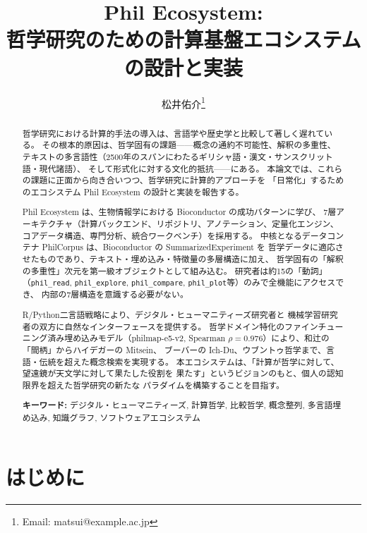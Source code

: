 \documentclass[a4paper,11pt]{ltjsarticle}
\title{{\LARGE Phil Ecosystem:\\
哲学研究のための計算基盤エコシステムの設計と実装}}
\author{松井佑介\thanks{Email: matsui@example.ac.jp}}
\date{}
\begin{document}
\maketitle

\begin{abstract}
哲学研究における計算的手法の導入は、言語学や歴史学と比較して著しく遅れている。
その根本的原因は、哲学固有の課題——概念の通約不可能性、解釈の多重性、
テキストの多言語性（2500年のスパンにわたるギリシャ語・漢文・サンスクリット語・現代諸語）、
そして形式化に対する文化的抵抗——にある。
本論文では、これらの課題に正面から向き合いつつ、哲学研究に計算的アプローチを
「日常化」するためのエコシステム Phil Ecosystem の設計と実装を報告する。

Phil Ecosystem は、生物情報学における Bioconductor の成功パターンに学び、
7層アーキテクチャ（計算バックエンド、リポジトリ、アノテーション、定量化エンジン、
コアデータ構造、専門分析、統合ワークベンチ）を採用する。
中核となるデータコンテナ PhilCorpus は、Bioconductor の SummarizedExperiment を
哲学データに適応させたものであり、テキスト・埋め込み・特徴量の多層構造に加え、
哲学固有の「解釈の多重性」次元を第一級オブジェクトとして組み込む。
研究者は約15の「動詞」（\texttt{phil\_read}, \texttt{phil\_explore},
\texttt{phil\_compare}, \texttt{phil\_plot}等）のみで全機能にアクセスでき、
内部の7層構造を意識する必要がない。

R/Python二言語戦略により、デジタル・ヒューマニティーズ研究者と
機械学習研究者の双方に自然なインターフェースを提供する。
哲学ドメイン特化のファインチューニング済み埋め込みモデル（philmap-e5-v2,
Spearman $\rho = 0.976$）により、和辻の「間柄」からハイデガーの Mitsein、
ブーバーの Ich-Du、ウブントゥ哲学まで、言語・伝統を超えた概念検索を実現する。
本エコシステムは、「計算が哲学に対して、望遠鏡が天文学に対して果たした役割を
果たす」というビジョンのもと、個人の認知限界を超えた哲学研究の新たな
パラダイムを構築することを目指す。

\medskip
\noindent\textbf{キーワード:}
デジタル・ヒューマニティーズ, 計算哲学, 比較哲学, 概念整列,
多言語埋め込み, 知識グラフ, ソフトウェアエコシステム
\end{abstract}

\tableofcontents
\newpage

\section{はじめに}\label{sec:intro}
\end{document}

